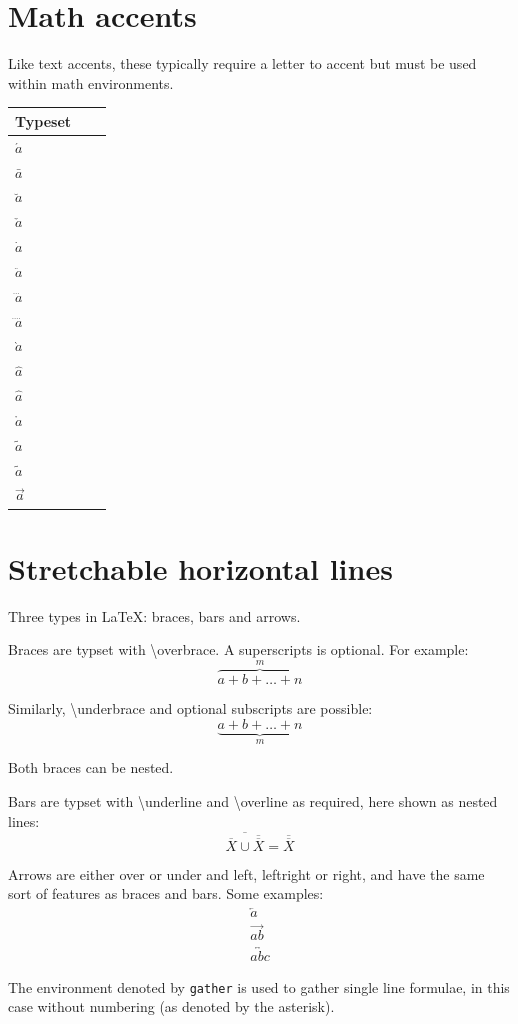 \documentclass{sample}
\begin{document}
\section{Math accents}
Like text accents, these typically require a letter to accent but must be used within math environments.
\begin{center}
	\begin{tabular}{llc}
	\toprule
	Typeset\\
	\midrule
	$\acute{a}$\\
	$\bar{a}$\\
	$\breve{a}$\\
	$\check{a}$\\
	$\dot{a}$\\
	$\ddot{a}$\\
	$\dddot{a}$\\
	$\ddddot{a}$\\
	$\grave{a}$\\
	$\hat{a}$\\
	$\widehat{a}$\\
	$\mathring{a}$\\
	$\tilde{a}$\\
	$\widetilde{a}$\\
	$\vec{a}$\\
	\bottomrule
	\end{tabular}
	\label{Ta:mathaccents}
\end{center}
\newpage
\section{Stretchable horizontal lines}
Three types in LaTeX: braces, bars and arrows.

Braces are typset with \textbackslash overbrace. A superscripts is optional. For example:
\[
\overbrace{a + b + \dots + n}^{m}
\]

Similarly, \textbackslash underbrace and optional subscripts are possible:
\[
\underbrace{a + b + \dots + n}_{m}
\]

Both braces can be nested.

Bars are typset with \textbackslash underline and \textbackslash overline as required, here shown as nested lines:
\[
\overline{
\overline{X} \cup \overline{\overline{X}}
} = \overline{\overline{X}}
\]

Arrows are either over or under and left, leftright or right, and have the same sort of features as braces and bars. Some examples:
\begin{gather*}
\overleftarrow{a}\\
\overrightarrow{ab}\\
\overleftrightarrow{abc}
\end{gather*}

The environment denoted by \texttt{gather} is used to gather single line formulae, in this case without numbering (as denoted by the asterisk).
\end{document}
